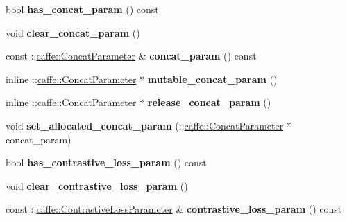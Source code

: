 \begin{DoxyCompactItemize}
bool {\bfseries has\+\_\+concat\+\_\+param} () const
\item 
\mbox{\label{classcaffe_1_1_v1_layer_parameter_a3e58977519da8bf66b91027c45824503}} 
void {\bfseries clear\+\_\+concat\+\_\+param} ()
\item 
\mbox{\label{classcaffe_1_1_v1_layer_parameter_a4a27842d8182915611ac4388c393fbe5}} 
const \+::\mbox{\hyperlink{classcaffe_1_1_concat_parameter}{caffe\+::\+Concat\+Parameter}} \& {\bfseries concat\+\_\+param} () const
\item 
\mbox{\label{classcaffe_1_1_v1_layer_parameter_ac9582d543e29f85abf05e6c9471e2e7e}} 
inline \+::\mbox{\hyperlink{classcaffe_1_1_concat_parameter}{caffe\+::\+Concat\+Parameter}} $\ast$ {\bfseries mutable\+\_\+concat\+\_\+param} ()
\item 
\mbox{\label{classcaffe_1_1_v1_layer_parameter_a7d55dd4402c5d37fbb782d95448b8716}} 
inline \+::\mbox{\hyperlink{classcaffe_1_1_concat_parameter}{caffe\+::\+Concat\+Parameter}} $\ast$ {\bfseries release\+\_\+concat\+\_\+param} ()
\item 
\mbox{\label{classcaffe_1_1_v1_layer_parameter_a29da037744a5e6fa6a9182852cb26b41}} 
void {\bfseries set\+\_\+allocated\+\_\+concat\+\_\+param} (\+::\mbox{\hyperlink{classcaffe_1_1_concat_parameter}{caffe\+::\+Concat\+Parameter}} $\ast$concat\+\_\+param)
\item 
\mbox{\label{classcaffe_1_1_v1_layer_parameter_ae1e9997fdfc1d13bdbf3bae330f548fd}} 
bool {\bfseries has\+\_\+contrastive\+\_\+loss\+\_\+param} () const
\item 
\mbox{\label{classcaffe_1_1_v1_layer_parameter_aefa52103cb318947f9d8688e1c2b0756}} 
void {\bfseries clear\+\_\+contrastive\+\_\+loss\+\_\+param} ()
\item 
\mbox{\label{classcaffe_1_1_v1_layer_parameter_a0eee0caa911d2647663b9cac8fd6139c}} 
const \+::\mbox{\hyperlink{classcaffe_1_1_contrastive_loss_parameter}{caffe\+::\+Contrastive\+Loss\+Parameter}} \& {\bfseries contrastive\+\_\+loss\+\_\+param} () const

\end{DoxyCompactItemize}
